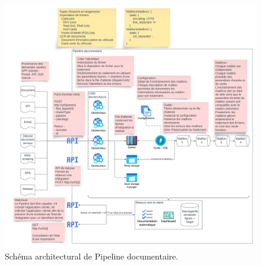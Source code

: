 \begin{figure}[ht]
    \centering
    \includegraphics[width=\textwidth]{img/schema-architectural}
    \caption{Schéma architectural de Pipeline documentaire.}
    \label{fig:architectural-schema}
\end{figure}